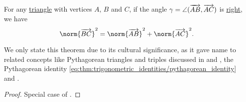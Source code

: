 \begin{theorem}\label{thm:pythagorean_theorem}
  For any \hyperref[def:triangle]{triangle} with vertices \( A \), \( B \) and \( C \), if the angle \( \gamma = \angle(\overrightarrow{AB}, \overrightarrow{AC}) \) is \hyperref[def:angle/measure/right]{right}, we have
  \begin{equation}\label{eq:thm:pythagorean_theorem}
    \norm{\vect{BC}}^2 = \norm{\vect{AB}}^2 + \norm{\vect{AC}}^2.
  \end{equation}
\end{theorem}
\begin{comments}
  \item We only state this theorem due to its cultural significance, as it gave name to related concepts like Pythagorean triangles and triples discussed in  and , the Pythagorean identity \eqref{eq:thm:trigonometric_identities/pythagorean_identity} and .
\end{comments}
\begin{proof}
  Special case of .
\end{proof}
